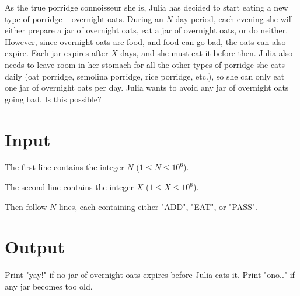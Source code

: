 
As the true porridge connoisseur she is, Julia has decided to start eating a new type of porridge --
overnight oats. During an $N$-day period, each evening she will either prepare a jar of overnight
oats, eat a jar of overnight oats, or do neither. However, since overnight oats are food, and food
can go bad, the oats can also expire. Each jar expires after $X$ days, and she must eat it before then.
Julia also needs to leave room in her stomach for all the other types of porridge she eats daily
(oat porridge, semolina porridge, rice porridge, etc.), so she can only eat one jar of
overnight oats per day. Julia wants to avoid any jar of overnight oats going bad. Is this possible?

\section*{Input}
The first line contains the integer $N$ ($1 \leq N \leq 10^6$).

The second line contains the integer $X$ ($1 \leq X \leq 10^6$).

Then follow $N$ lines, each containing either "ADD", "EAT", or "PASS".

\section*{Output}
Print "yay!" if no jar of overnight oats expires before Julia eats it.
Print "ono.." if any jar becomes too old.


